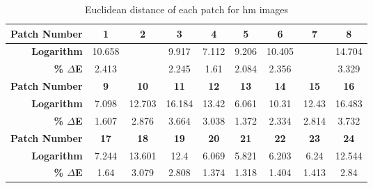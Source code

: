 \begin{table}[H]
  \caption{Euclidean distance of each patch for hm images }
  \begin{center}
    \begin{tabularx}{\textwidth}{r c c c c c c c c}
    \toprule
        \textbf{Patch Number} & \textbf{1} & \textbf{2} & \textbf{3} & \textbf{4} & \textbf{5} & \textbf{6} & \textbf{7} & \textbf{8}\\ \midrule 
        \textbf{Logarithm} &10.658 &\cellcolor{colorgreen}{3.084} &9.917 &7.112 &9.206 &10.405 &\cellcolor{colorred}{18.933} &14.704\\ 
        \textbf{\textbf{\% $\Delta$E}} &2.413 &\cellcolor{colorgreen}{0.698} &2.245 &1.61 &2.084 &2.356 &\cellcolor{colorred}{4.287} &3.329\\ \midrule 
        \textbf{Patch Number} & \textbf{9} & \textbf{10} & \textbf{11} & \textbf{12} & \textbf{13} & \textbf{14} & \textbf{15} & \textbf{16}\\ \midrule 
        \textbf{Logarithm} &7.098 &12.703 &16.184 &13.42 &6.061 &10.31 &12.43 &16.483\\ 
        \textbf{\textbf{\% $\Delta$E}} &1.607 &2.876 &3.664 &3.038 &1.372 &2.334 &2.814 &3.732\\ \midrule 
        \textbf{Patch Number} & \textbf{17} & \textbf{18} & \textbf{19} & \textbf{20} & \textbf{21} & \textbf{22} & \textbf{23} & \textbf{24}\\ \midrule 
        \textbf{Logarithm} &7.244 &13.601 &12.4 &6.069 &5.821 &6.203 &6.24 &12.544\\ 
        \textbf{\textbf{\% $\Delta$E}} &1.64 &3.079 &2.808 &1.374 &1.318 &1.404 &1.413 &2.84\\ \midrule 
    \bottomrule
    \end{tabularx}
  \end{center}
\end{table}
